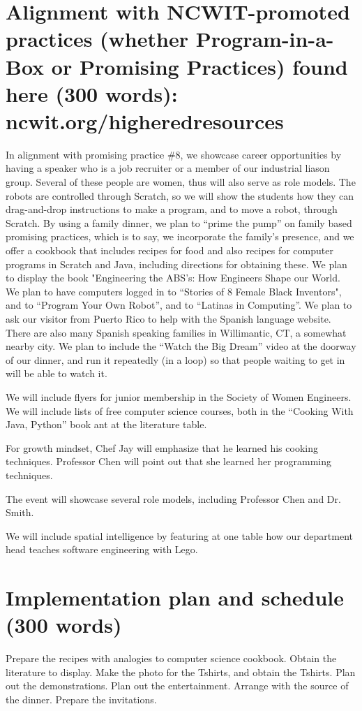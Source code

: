 \documentclass[]{article}
\begin{document}
\section{Alignment with NCWIT-promoted practices (whether Program-in-a-Box or Promising
Practices) found here (300 words): ncwit.org/higheredresources}
In alignment with promising practice \#8, we showcase career opportunities by having a speaker who is a job recruiter or a member of our industrial liason group. Several of these people are women, thus will also serve as role models. The robots are controlled through Scratch, so we will show the students how they can drag-and-drop instructions to make a program, and to move a robot, through Scratch. 
By using a family dinner, we plan to ``prime the pump'' on family based promising practices, which is to say, we incorporate the family's presence, and we offer a cookbook that includes recipes for food and also recipes for computer programs in Scratch and Java, including directions for obtaining these. 
We plan to display the book "Engineering the ABS's: How Engineers Shape our World.
We plan to have computers logged in to  ``Stories of 8 Female Black Inventors", and to ``Program Your Own Robot'', and to ``Latinas in Computing''. We plan to ask our visitor from Puerto Rico to help with the Spanish language website. There are also many Spanish speaking families in Willimantic, CT, a somewhat nearby city. We plan to include the ``Watch the Big Dream'' video at the doorway of our dinner, and run it repeatedly (in a loop) so that people waiting to get in will be able to watch it.

We will include flyers for junior membership in the Society of Women Engineers. We will include lists of free computer science courses, both in the ``Cooking With Java, Python'' book ant at the literature table.

For growth mindset, Chef Jay will emphasize that he learned his cooking techniques. Professor Chen will point out that she learned her programming techniques.

The event will showcase several role models, including Professor Chen and Dr. Smith.

We will include spatial intelligence by featuring at one table how our department head teaches software engineering with Lego.%


\section{Implementation plan and schedule (300 words)}
Prepare the recipes with analogies to computer science cookbook.
Obtain the literature to display.
Make the photo for the Tshirts, and obtain the Tshirts.
Plan out the demonstrations.
Plan out the entertainment.
Arrange with the source of the dinner.
Prepare the invitations.
\end{document}
